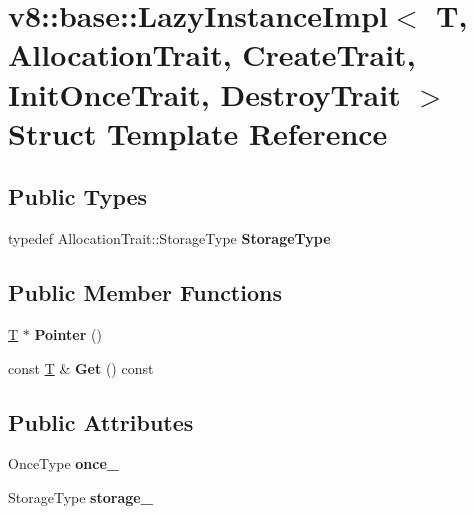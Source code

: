 \hypertarget{structv8_1_1base_1_1LazyInstanceImpl}{}\section{v8\+:\+:base\+:\+:Lazy\+Instance\+Impl$<$ T, Allocation\+Trait, Create\+Trait, Init\+Once\+Trait, Destroy\+Trait $>$ Struct Template Reference}
\label{structv8_1_1base_1_1LazyInstanceImpl}
\subsection*{Public Types}
\begin{DoxyCompactItemize}
\item 
\mbox{\label{structv8_1_1base_1_1LazyInstanceImpl_a932ebac30855580c8ae22feb343b4b97}} 
typedef Allocation\+Trait\+::\+Storage\+Type {\bfseries Storage\+Type}
\end{DoxyCompactItemize}
\subsection*{Public Member Functions}
\begin{DoxyCompactItemize}
\item 
\mbox{\label{structv8_1_1base_1_1LazyInstanceImpl_a731d414ae2f2f0fafb4df47502b21068}} 
\mbox{\hyperlink{classv8_1_1internal_1_1torque_1_1T}{T}} $\ast$ {\bfseries Pointer} ()
\item 
\mbox{\label{structv8_1_1base_1_1LazyInstanceImpl_a1681de87b1d1320de538855b9bc8eaf4}} 
const \mbox{\hyperlink{classv8_1_1internal_1_1torque_1_1T}{T}} \& {\bfseries Get} () const
\end{DoxyCompactItemize}
\subsection*{Public Attributes}
\begin{DoxyCompactItemize}
\item 
\mbox{\label{structv8_1_1base_1_1LazyInstanceImpl_afb03ba68ffaf3610be2c2f021cc5faf5}} 
Once\+Type {\bfseries once\+\_\+}
\item 
\mbox{\label{structv8_1_1base_1_1LazyInstanceImpl_a0fb34dedfa24df4e163436cd46d4faa7}} 
Storage\+Type {\bfseries storage\+\_\+}
\end{DoxyCompactItemize}


